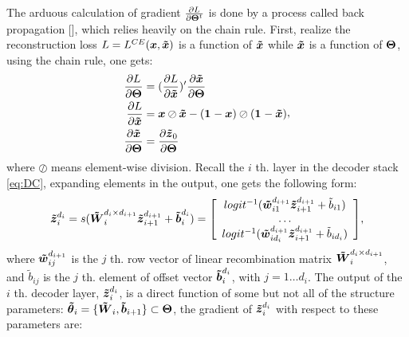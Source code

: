 The arduous calculation of gradient $\frac{\partial L}{\partial \boldsymbol{\Theta}^t}$ is done by a process called back propagation [], which relies heavily on the chain rule. First, realize the reconstruction loss $L=L^{CE}(\boldsymbol{x}, \boldsymbol{\tilde{x}})$ is a function of $\boldsymbol{\tilde{x}}$ while $\boldsymbol{\tilde{x}}$ is a function of $\boldsymbol{\Theta}$, using the chain rule, one gets:
\begin{equation*}
\begin{split}
  \frac{\partial L}{\partial \boldsymbol{\Theta}} &= (\frac{\partial L}{\partial \boldsymbol{\tilde{x}}})^{\prime} \frac{\partial \boldsymbol{\tilde{x}}}{\partial \boldsymbol{\Theta}} \\
  \frac{\partial L}{\partial \boldsymbol{\tilde{x}}} &= \boldsymbol{x} \oslash \boldsymbol{\tilde{x}} -  (\boldsymbol{1}^{} - \boldsymbol{x}) \oslash (\boldsymbol{1}^{} - \boldsymbol{\tilde{x}}) \\
  \frac{\partial \boldsymbol{\tilde{x}}}{\partial \boldsymbol{\Theta}} &= \frac{\partial \boldsymbol{\tilde{z}}_0}{\partial \boldsymbol{\Theta}}
\end{split},
\end{equation*}
where $\oslash$ means element-wise division. 
Recall the $i$ th. layer in the decoder stack \ref{eq:DC}, expanding elements in the output, one gets the following form:
\begin{equation*}
\begin{split}
  \boldsymbol{\tilde{z}}_i^{d_i} &= s(\boldsymbol{\tilde{W}}_i^{d_i \times d_{i+1}} \boldsymbol{\tilde{z}}_{i+1}^{d_{i+1}} + \boldsymbol{\tilde{b}}_i^{d_i})
  = \left[ \begin{array}{c}
    logit^{-1}(\boldsymbol{\tilde{w}}_{i1}^{d_{i+1}} \boldsymbol{\tilde{z}}_{i+1}^{d_{i+1}} + \tilde{b}_{i1}) \\
    \dots \\
    logit^{-1}(\boldsymbol{\tilde{w}}_{id_i}^{d_{i+1}} \boldsymbol{\tilde{z}}_{i+1}^{d_{i+1}} + \tilde{b}_{id_i}) \\
  \end{array} \right] \\
\end{split},
\end{equation*}
where $\boldsymbol{\tilde{w}}_{ij}^{d_{i+1}}$ is the $j$ th. row vector of linear recombination matrix $\boldsymbol{\tilde{W}}_i^{d_i \times d_{i+1}}$, and $\tilde{b}_{ij}$ is the $j$ th. element of offset vector $\boldsymbol{\tilde{b}}_i^{d_i}$, with $j=1 \dots d_i$. The output of the $i$ th. decoder layer, $\boldsymbol{\tilde{z}}_i^{d_i}$, is a direct function of some but not all of the structure parameters: $\boldsymbol{\tilde{\theta}}_i = \{\boldsymbol{\tilde{W}}_i, \boldsymbol{\tilde{b}}_{i+1}\} \subset \boldsymbol{\Theta}$, the gradient of $\boldsymbol{\tilde{z}}_i^{d_i}$ with respect to these parameters are:
